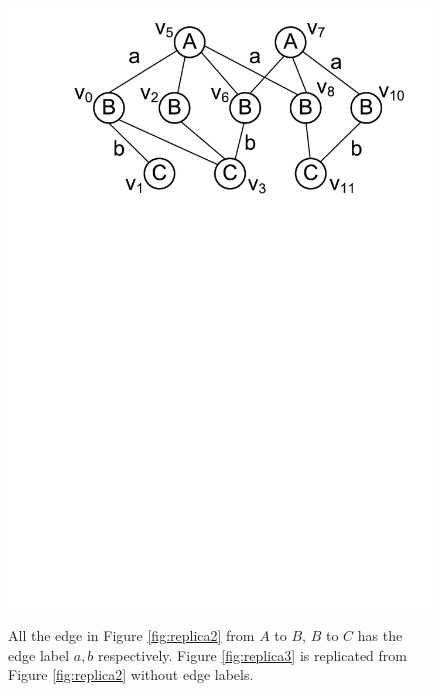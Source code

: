 \begin{figure}[h!]
{		\includegraphics[scale=0.30]{images/replica2}
		\label{fig:replica2}
	}
	\vspace{-2mm}
	\caption{\scriptsize All the edge in Figure \ref{fig:replica2} from $A$ to $B$, $B$ to $C$ has the edge label $a,b$ respectively. Figure \ref{fig:replica3} is replicated from Figure \ref{fig:replica2} without edge labels.}
	\label{fig:replica}
	\vspace{-6mm}
\end{figure}
